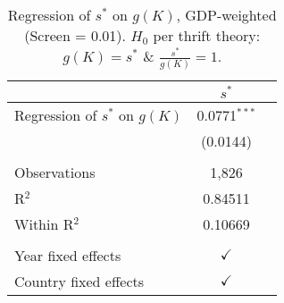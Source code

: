 \begin{table}[pos=h]
\caption{Regression of \(s^*\) on \(g(K)\), GDP-weighted (Screen = 0.01). \(H_0\) per thrift theory: \(g(K) = s^*\) \& \(\frac{s^*}{g(K)} = 1\).}
\centering
\begin{tabularx}{\columnwidth}{lcc}
   \toprule
                                     & $s^*$ \\   
   \midrule 
   Regression of $s^*$ on \(g(K)\)   & 0.0771$^{***}$\\   
                                     & (0.0144)\\   
    \\
   Observations                      & 1,826\\  
   R$^2$                             & 0.84511\\  
   Within R$^2$                      & 0.10669\\  
    \\
   Year fixed effects                & $\checkmark$\\   
   Country fixed effects             & $\checkmark$\\   
   \bottomrule
\end{tabularx}
   \label{tbl-4}
\end{table}